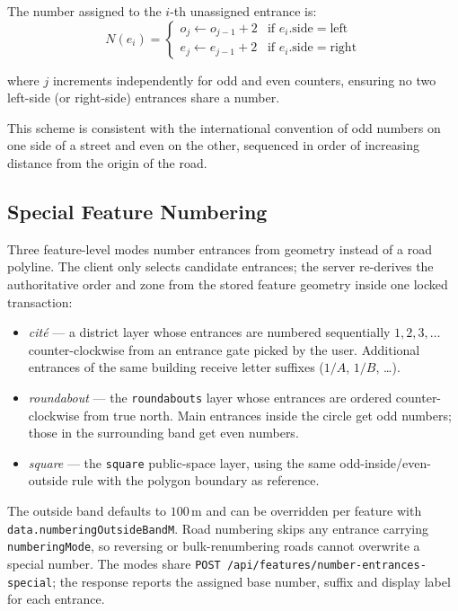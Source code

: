 \documentclass[12pt,a4paper]{article}
\theoremstyle{definition}
\theoremstyle{plain}
\theoremstyle{remark}
\begin{document}
The number assigned to the $i$-th unassigned entrance is:
\begin{equation}
  N(e_i) =
  \begin{cases}
    o_j \leftarrow o_{j-1} + 2 & \text{if } e_i.\mathrm{side} = \mathrm{left}  \\
    e_j \leftarrow e_{j-1} + 2 & \text{if } e_i.\mathrm{side} = \mathrm{right}
  \end{cases}
  \label{eq:entrance_number}
\end{equation}

where $j$ increments independently for odd and even counters, ensuring
no two left-side (or right-side) entrances share a number.

This scheme is consistent with the international convention of odd numbers
on one side of a street and even on the other, sequenced in order of
increasing distance from the origin of the road.

\subsection{Special Feature Numbering}
\label{sec:special_numbering}

Three feature-level modes number entrances from geometry instead of a road
polyline. The client only selects candidate entrances; the server re-derives
the authoritative order and zone from the stored feature geometry inside one
locked transaction:

\begin{itemize}
  \item \emph{cit\'e} --- a district layer whose entrances are numbered
    sequentially $1, 2, 3, \ldots$ counter-clockwise from an entrance gate
    picked by the user. Additional entrances of the same building receive
    letter suffixes ($1/A$, $1/B$, \ldots).
  \item \emph{roundabout} --- the \texttt{roundabouts} layer whose entrances are ordered
    counter-clockwise from true north. Main entrances inside the circle get
    odd numbers; those in the surrounding band get even numbers.
  \item \emph{square} --- the \texttt{square} public-space layer, using the
    same odd-inside/even-outside rule with the polygon boundary as reference.
\end{itemize}

The outside band defaults to $100\,\mathrm{m}$ and can be overridden per
feature with \texttt{data.numberingOutsideBandM}. Road numbering skips any
entrance carrying \texttt{numberingMode}, so reversing or bulk-renumbering
roads cannot overwrite a special number. The modes share
\texttt{POST /api/features/number-entrances-special}; the response reports the
assigned base number, suffix and display label for each entrance.
\end{document}
